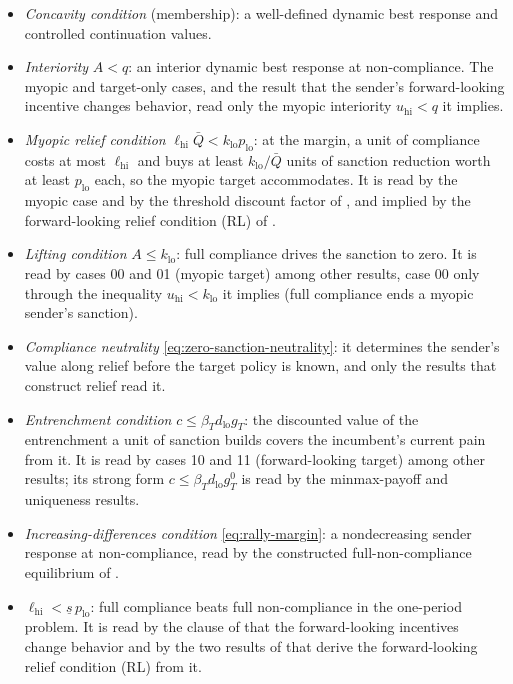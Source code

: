 \begin{itemize}
\item \emph{Concavity condition} (membership): a well-defined dynamic best
response and controlled continuation values.
\item \emph{Interiority} $A<q$: an interior dynamic best response at non-compliance.
The myopic and target-only cases, and the result that the sender's
forward-looking incentive changes behavior, read only the myopic interiority
$u_{\mathrm{hi}}<q$ it implies.
\item \emph{Myopic relief condition}
$\ell_{\mathrm{hi}}\bar Q<k_{\mathrm{lo}}p_{\mathrm{lo}}$: at the margin, a unit
of compliance costs at most $\ell_{\mathrm{hi}}$ and buys at least
$k_{\mathrm{lo}}/\bar Q$ units of sanction reduction worth at least
$p_{\mathrm{lo}}$ each, so the myopic target accommodates. It is read by the
myopic case and by the threshold discount factor of
, and implied by the forward-looking relief condition
\textup{(RL)} of .
\item \emph{Lifting condition} $A\le k_{\mathrm{lo}}$: full compliance drives the
sanction to zero. It is read by cases 00 and 01 (myopic target) among other
results, case 00 only through the inequality $u_{\mathrm{hi}}<k_{\mathrm{lo}}$ it
implies (full compliance ends a myopic sender's sanction).
\item \emph{Compliance neutrality} \eqref{eq:zero-sanction-neutrality}: it
determines the sender's value along relief before the target policy is known,
and only the results that construct relief read it.
\item \emph{Entrenchment condition} $c\le\beta_Td_{\mathrm{lo}}g_T$: the
discounted value of the entrenchment a unit of sanction builds covers the
incumbent's current pain from it. It is read by cases 10 and 11
(forward-looking target) among other results; its strong form
$c\le\beta_Td_{\mathrm{lo}}g_T^0$ is read by the minmax-payoff and uniqueness
results.
\item \emph{Increasing-differences condition} \eqref{eq:rally-margin}: a
nondecreasing sender response at non-compliance, read by the constructed full-non-compliance
equilibrium of .
\item $\ell_{\mathrm{hi}}<\underline s\,p_{\mathrm{lo}}$: full compliance beats
full non-compliance in the one-period problem. It is read by the clause of
 that the forward-looking incentives change behavior
and by the two results of  that derive the forward-looking
relief condition \textup{(RL)} from it.
\end{itemize}

